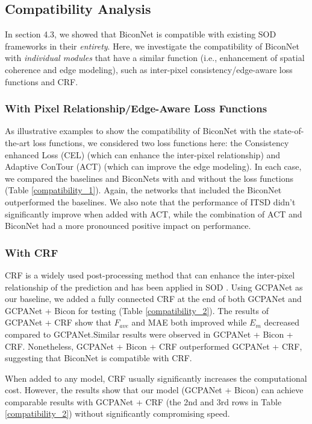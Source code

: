\documentclass[final]{cvpr}
\begin{document}
\subsection{Compatibility Analysis}
In section 4.3, we showed that BiconNet is compatible with existing SOD frameworks in their \textit{entirety}. Here, we investigate the compatibility of BiconNet with \textit{individual modules} that have a similar function (i.e., enhancement of spatial coherence and edge modeling), such as inter-pixel consistency/edge-aware loss functions and CRF.

\subsubsection{With Pixel Relationship/Edge-Aware Loss Functions}
As illustrative examples to show the compatibility of BiconNet with the state-of-the-art loss functions, we considered two loss functions here: the Consistency enhanced Loss (CEL) \cite{MINet} (which can enhance the inter-pixel relationship) and Adaptive ConTour (ACT) \cite{ITSD} (which can improve the edge modeling). In each case, we compared the baselines and BiconNets with and without the loss functions (Table \ref{compatibility_1}). Again, the networks that included the BiconNet outperformed the baselines. We also note that the performance of ITSD didn’t significantly improve when added with ACT, while the combination of ACT and BiconNet had a more pronounced positive impact on performance. 




\subsubsection{With CRF}
CRF is a widely used post-processing method that can enhance the inter-pixel relationship of the prediction and has been applied in SOD \cite{picanet,DSS,crf2}. Using GCPANet as our baseline, we added a fully connected CRF at the end of both GCPANet and GCPANet + Bicon for testing (Table \ref{compatibility_2}). The results of GCPANet + CRF show that $F_{ave}$ and MAE both improved while $E_m$ decreased compared to GCPANet.Similar results were observed in GCPANet + Bicon + CRF. Nonetheless, GCPANet + Bicon + CRF outperformed GCPANet + CRF, suggesting that BiconNet is compatible with CRF. 

When added to any model, CRF usually significantly increases the computational cost. However, the results show that our model (GCPANet + Bicon) can achieve comparable results with GCPANet + CRF (the 2nd and 3rd rows in Table \ref{compatibility_2}) without significantly compromising speed. 
\end{document}
